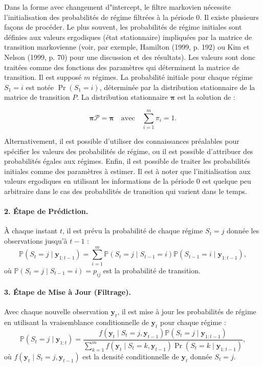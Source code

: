 \begin{sloppypar}
Dans la forme avec changement d"intercept, le filtre markovien nécessite l'initialisation des probabilités de régime filtrées à la période 0. Il existe plusieurs façons de procéder. Le plus souvent, les probabilités de régime initiales sont définies aux valeurs ergodiques (état stationnaire) impliquées par la matrice de transition markovienne (voir, par exemple, Hamilton (1999, p. 192) ou Kim et Nelson (1999, p. 70) pour une discussion et des résultats). Les valeurs sont donc traitées comme des fonctions des paramètres qui déterminent la matrice de transition. Il est supposé \( m \) régimes. La probabilité initiale pour chaque régime \( S_1 = i \) est notée \( \Pr(S_1 = i) \), déterminée par la distribution stationnaire de la matrice de transition \( P \). La distribution stationnaire \( \bm{\pi} \) est la solution de :

\begin{equation}
 \bm{\pi} \mathcal{P} = \bm{\pi} \quad \text{avec} \quad \sum_{i=1}^m \pi_i = 1. 
\end{equation}

Alternativement, il est possible d'utiliser des connaissances préalables pour spécifier les valeurs des probabilités de régime, ou il est possible d'attribuer des probabilités égales aux régimes. Enfin, il est possible de traiter les probabilités initiales comme des paramètres à estimer. Il est à noter que l'initialisation aux valeurs ergodiques en utilisant les informations de la période 0 est quelque peu arbitraire dans le cas des probabilités de transition qui varient dans le temps.

\paragraph{2. Étape de Prédiction.} À chaque instant \( t \), il est prévu la probabilité de chaque régime \( S_t = j \) donnée les observations jusqu'à \( t-1 \) :
\[
\mathbb{P}(S_t = j \mid \bm{y}_{1:t-1}) = \sum_{i=1}^m \mathbb{P}(S_t = j \mid S_{t-1} = i) \mathbb{P}(S_{t-1} = i \mid \bm{y}_{1:t-1}),
\]
où \( \mathbb{P}(S_t = j \mid S_{t-1} = i) = p_{ij} \) est la probabilité de transition.

\paragraph{3. Étape de Mise à Jour (Filtrage).} Avec chaque nouvelle observation \( \bm{y}_t \), il est mise à jour les probabilités de régime en utilisant la vraisemblance conditionnelle de \( \bm{y}_t \) pour chaque régime :
\[
\mathbb{P}(S_t = j \mid \bm{y}_{1:t}) = \frac{f(\bm{y}_t \mid S_t = j, \bm{y}_{t-1}) \mathbb{P}(S_t = j \mid \bm{y}_{1:t-1})}{\sum_{k=1}^m f(\bm{y}_t \mid S_t = k, \bm{y}_{t-1}) \Pr(S_t = k \mid \bm{y}_{1:t-1})},
\]
où \( f(\bm{y}_t \mid S_t = j, \bm{y}_{t-1}) \) est la densité conditionnelle de \( \bm{y}_t \) donnée \( S_t = j \).


\end{sloppypar}
